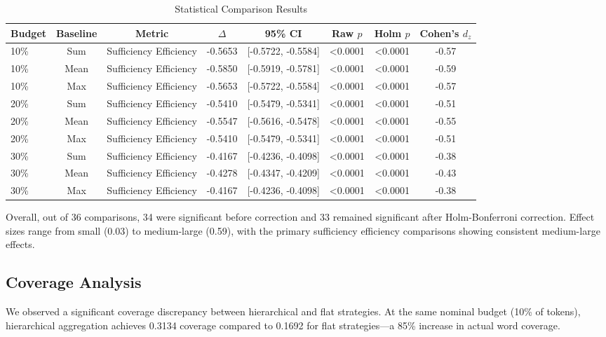 \documentclass[journal]{IEEEtran}
\begin{document}
\begin{table}[htbp]
\centering
\caption{Statistical Comparison Results}
\label{tab:statistical}
\begin{tabular}{lccccccc}
\toprule
Budget & Baseline & Metric & $\Delta$ & 95\% CI & Raw $p$ & Holm $p$ & Cohen's $d_z$ \\
\midrule
10\% & Sum & Sufficiency Efficiency & -0.5653 & [-0.5722, -0.5584] & <0.0001 & <0.0001 & -0.57 \\
10\% & Mean & Sufficiency Efficiency & -0.5850 & [-0.5919, -0.5781] & <0.0001 & <0.0001 & -0.59 \\
10\% & Max & Sufficiency Efficiency & -0.5653 & [-0.5722, -0.5584] & <0.0001 & <0.0001 & -0.57 \\
20\% & Sum & Sufficiency Efficiency & -0.5410 & [-0.5479, -0.5341] & <0.0001 & <0.0001 & -0.51 \\
20\% & Mean & Sufficiency Efficiency & -0.5547 & [-0.5616, -0.5478] & <0.0001 & <0.0001 & -0.55 \\
20\% & Max & Sufficiency Efficiency & -0.5410 & [-0.5479, -0.5341] & <0.0001 & <0.0001 & -0.51 \\
30\% & Sum & Sufficiency Efficiency & -0.4167 & [-0.4236, -0.4098] & <0.0001 & <0.0001 & -0.38 \\
30\% & Mean & Sufficiency Efficiency & -0.4278 & [-0.4347, -0.4209] & <0.0001 & <0.0001 & -0.43 \\
30\% & Max & Sufficiency Efficiency & -0.4167 & [-0.4236, -0.4098] & <0.0001 & <0.0001 & -0.38 \\
\bottomrule
\end{tabular}
\end{table}

Overall, out of 36 comparisons, 34 were significant before correction and 33 remained significant after Holm-Bonferroni correction. Effect sizes range from small (0.03) to medium-large (0.59), with the primary sufficiency efficiency comparisons showing consistent medium-large effects.

\subsection{Coverage Analysis}

We observed a significant coverage discrepancy between hierarchical and flat strategies. At the same nominal budget (10\% of tokens), hierarchical aggregation achieves 0.3134 coverage compared to 0.1692 for flat strategies—a 85\% increase in actual word coverage.
\end{document}
